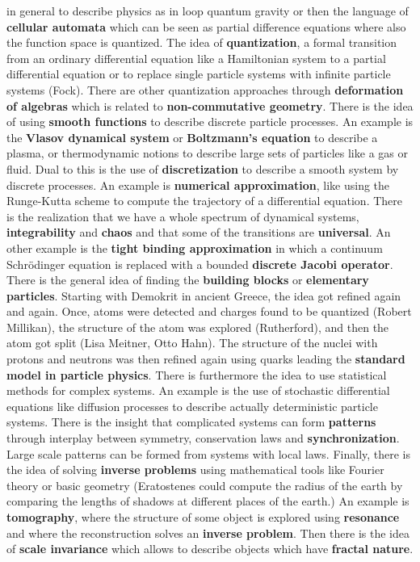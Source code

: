 \documentclass[12pt]{amsart}
\newcounter{example}    \def\example#1{ \item \fontsize{12}{15} \selectfont #1 \fontsize{12}{15} \selectfont }
\begin{document}
in general to describe physics as in loop quantum gravity or then the language of 
{\bf cellular automata} which can be seen as partial difference equations where also the
function space is quantized. The idea of {\bf quantization}, a formal transition from an
ordinary differential equation like a Hamiltonian system to a partial differential equation
or to replace single particle systems with infinite particle systems (Fock). There are other
quantization approaches through {\bf deformation of algebras} which is related to 
{\bf non-commutative geometry}. There is the idea of using {\bf smooth functions} to 
describe discrete particle processes. An example is the {\bf Vlasov dynamical system} or 
{\bf Boltzmann's equation}  to describe a plasma, or thermodynamic notions to describe large sets of particles like a 
gas or fluid. Dual to this is the use of {\bf discretization} to describe a smooth system 
by discrete processes. An example is {\bf numerical approximation}, like using the Runge-Kutta 
scheme to compute the trajectory of a differential equation. 
There is the realization that we have a whole spectrum of dynamical systems, 
{\bf integrability} and {\bf chaos} and that some of the transitions are 
{\bf universal}. An other example is the {\bf tight binding approximation} in which 
a continuum Schr\"odinger equation is replaced with a bounded {\bf discrete Jacobi operator}.
There is the general idea of finding the {\bf building blocks} or {\bf elementary particles}.
Starting with Demokrit in ancient Greece, the idea got refined again and again. Once, atoms
were detected and charges found to be quantized (Robert Millikan), the structure of the atom was
explored (Rutherford), and then the atom got split (Lisa Meitner, Otto Hahn). The structure of the 
nuclei with protons and neutrons was then refined again using quarks leading the {\bf standard model
in particle physics}. There is furthermore the idea to use statistical methods for complex systems. 
An example is the use of stochastic
differential equations like diffusion processes to describe actually deterministic particle
systems. There is the insight that complicated systems can form {\bf patterns} through
interplay between symmetry, conservation laws and {\bf synchronization}. Large scale patterns
can be formed from systems with local laws. Finally, there is
the idea of solving {\bf inverse problems} using mathematical tools like Fourier theory
or basic geometry (Eratostenes could compute the radius of the earth by comparing the lengths of shadows
at different places of the earth.)
An example is {\bf tomography}, where the structure of some object is explored using 
{\bf resonance} and where the reconstruction solves an {\bf inverse problem}. 
Then there is the idea of {\bf scale invariance} which allows to describe
objects which have {\bf fractal nature}.  \\
\end{document}
